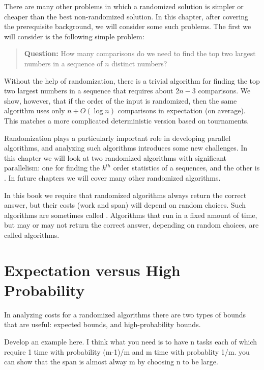 {There are many other problems in which a randomized solution is
simpler or cheaper than the best non-randomized solution.  In this
chapter, after covering the prerequisite background, we will consider
some such problems.  The first we will consider is the following
simple problem:
\begin{quote}
  \textbf{Question:} How many comparisons do we need to find the top two 
largest numbers in a sequence of $n$ distinct numbers?
\end{quote}
Without the help of randomization, there is a trivial algorithm for
finding the top two largest numbers in a sequence that requires about
$2n - 3$ comparisons.  We show, however, that if the order of the
input is randomized, then the same algorithm uses only $n + O(\log n)$
comparisons in expectation (on average).  This matches a more
complicated deterministic version based on tournaments.

Randomization plays a particularly important role in developing parallel
algorithms, and analyzing such algorithms introduces some new
challenges.  
%
In this chapter we will look at two randomized algorithms with
significant parallelism: one for finding the $k^{th}$ order statistics
of a sequences, and the other is \qsort.  In future chapters we will
cover many other randomized algorithms.

In this book we require that randomized algorithms always return the
correct answer, but their costs (work and span) will depend on random
choices.  
%
Such algorithms are sometimes called .
Algorithms that run in a fixed amount of time, but may or may not
return the correct answer, depending on random choices, are called
 algorithms.


\section{Expectation versus High Probability}
\label{sec:randomized::probability}

In analyzing costs for a randomized algorithms there are two types of
bounds that are useful: expected bounds, and high-probability bounds.
%

\begin{todo}
Develop an example here.  I think what you need is to have n tasks
each of which require 1 time with probability (m-1)/m and m time with
probablity 1/m.  you can show that the span is almost alway m by
choosing n to be large.
\end{todo}


}
